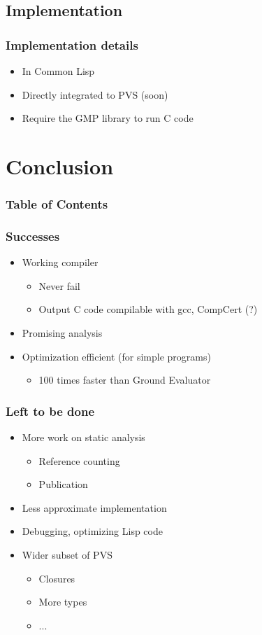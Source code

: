 \documentclass{beamer}
\begin{document}
\subsection{Implementation}

\begin{frame}
\frametitle{Implementation details}
\begin{itemize}
\itemsep2em
\item In Common Lisp
\item Directly integrated to PVS  (soon)
\item Require the GMP library to run C code
\end{itemize}

\end{frame}



\section{Conclusion}
\begin{frame}
\frametitle{Table of Contents}
\tableofcontents[currentsection]
\end{frame}

\begin{frame}
\frametitle{Successes}
\begin{itemize}
\itemsep2em
\item Working compiler
\begin{itemize}
\item Never fail
\item Output C code compilable with gcc, CompCert (?)
\end{itemize}
\item Promising analysis
\item Optimization efficient (for simple programs)
\begin{itemize}
\item 100 times faster than Ground Evaluator
\end{itemize}
\end{itemize}
\end{frame}


\begin{frame}
\frametitle{Left to be done}
\begin{itemize}
\itemsep2em
\item More work on static analysis
\begin{itemize}
\item Reference counting
\item Publication
\end{itemize} 
\item Less approximate implementation
\item Debugging, optimizing Lisp code
\item Wider subset of PVS
\begin{itemize}
\item Closures
\item More types
\item ...
\end{itemize}
\end{itemize}
\end{frame}
\end{document}
